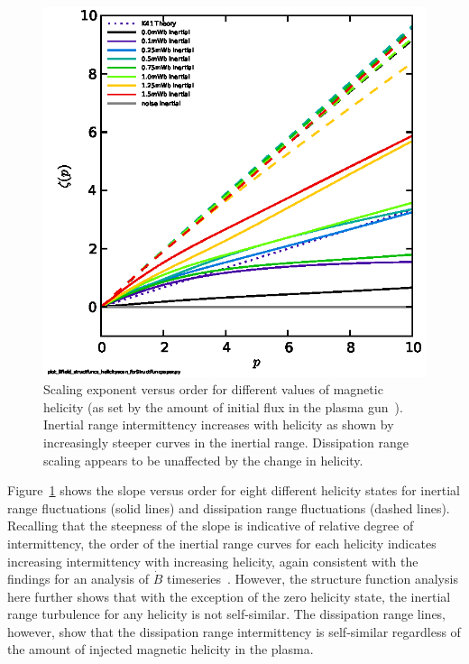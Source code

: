 \documentclass[preprint2]{aastex}
\begin{document}
\begin{figure}
\includegraphics[width={\columnwidth}]{fig5.eps}
\caption{\label{fig:helscan} Scaling exponent versus order for different values of magnetic helicity (as set by the amount of initial flux in the plasma gun~\citep{schaffner2014b}). Inertial range intermittency increases with helicity as shown by increasingly steeper curves in the inertial range. Dissipation range scaling appears to be unaffected by the change in helicity. }
\end{figure}

Figure~\ref{fig:helscan} shows the slope versus order for eight different helicity states for inertial range fluctuations (solid lines) and dissipation range fluctuations (dashed lines). Recalling that the steepness of the slope is indicative of relative degree of intermittency, the order of the inertial range curves for each helicity indicates increasing intermittency with increasing helicity, again consistent with the findings for an analysis of $\dot{B}$ timeseries~\citep{schaffner2014b}. However, the structure function analysis here further shows that with the exception of the zero helicity state, the inertial range turbulence for any helicity is not self-similar. The dissipation range lines, however, show that the dissipation range intermittency is self-similar regardless of the amount of injected magnetic helicity in the plasma.
\end{document}

